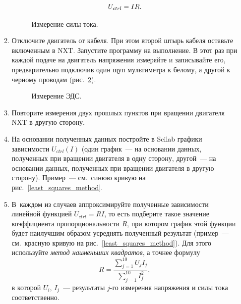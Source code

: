 \documentclass[12pt, a4paper, openany]{extarticle}
\begin{document}
\begin{enumerate}
\begin{enumerate}
\begin{equation}
	U_{ctrl} = IR\ldotp
\end{equation}
\begin{figure}[h]
	\caption{Измерение силы тока.}
	\label{sila_toka}
\end{figure}
\item \label{EiiliNaprazh}Отключите двигатель от кабеля. При этом второй штырь кабеля оставьте включенным в NXT. Запустите программу на выполнение. В этот раз при каждой подаче на двигатель напряжения измеряйте и записывайте его, предварительно подключив один щуп мультиметра к белому, а другой к черному проводам (рис.~\ref{naprazh}).

\begin{figure}[h]
	\caption{Измерение ЭДС.}
	\label{naprazh}
\end{figure}
\item Повторите измерения двух прошлых пунктов при вращении двигателя NXT в другую сторону.
\item На основании полученных данных постройте в Scilab графики зависимости $U_{ctrl}(I)$ (один график~--- на основании данных, полученных при вращении двигателя в одну сторону, другой~--- на основании данных, полученных при вращении двигателя в другую сторону).
Пример~--- см.~синюю кривую на рис.~\ref{least_squares_method}.
\item В~каждом из случаев аппроксимируйте полученные зависимости линейной функцией $U_{ctrl} = RI$, то есть подберите такое значение коэффициента пропорциональности $R$, при котором график этой функции будет наилучшим образом усреднять полученный результат (пример~--- см.~красную кривую на рис.~\ref{least_squares_method}). Для этого используйте \textit{метод наименьших квадратов}, а точнее формулу
\begin{equation}
	R = \frac{\sum\limits_{j=1}^{10}U_jI_j}{\sum\limits_{j=1}^{10}I^2_j},
\end{equation}
в которой $U_i$, $I_j$~--- результаты $j$-го измерения напряжения и силы тока соответственно.
\begin{figure}[h]

\end{figure}
\end{enumerate}
\end{enumerate}
\end{document}
